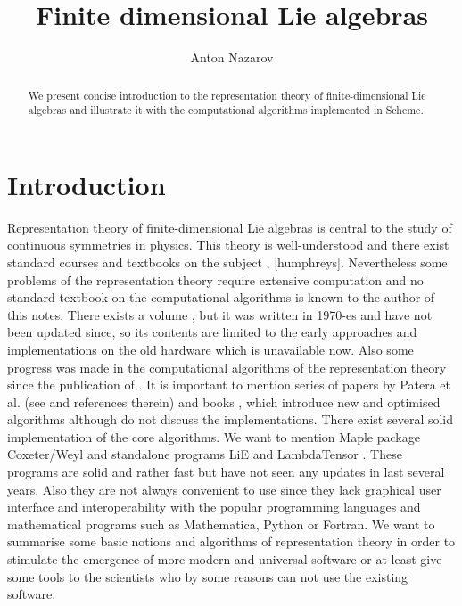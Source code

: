 \documentclass[a4paper,10pt]{article}%
\theoremstyle{definition} \newtheorem{Def}{Definition}
\begin{document}
\nwdocspar
\title{Finite dimensional Lie algebras}
\author{Anton Nazarov}
\maketitle
\begin{abstract}
  We present concise introduction to the representation theory of finite-dimensional Lie algebras and illustrate it with the computational algorithms implemented in Scheme. 
\end{abstract}
\section{Introduction}
\label{sec:introduction}
Representation theory of finite-dimensional Lie algebras is central to the study of continuous symmetries in physics. This theory is well-understood and there exist standard courses and textbooks on the subject \cite{carter2005lie}, [humphreys]. Nevertheless some problems of the representation theory require extensive computation and no standard textbook on the computational algorithms is known to the author of this notes. There exists a volume \cite{belinfante1989survey}, but it was written in 1970-es and have not been updated since, so its contents are limited to the early approaches and implementations on the old hardware which is unavailable now. Also some progress was made in the computational algorithms of the representation theory since the publication of \cite{belinfante1989survey}. It is important to mention series of papers by Patera et al. (see \cite{moody1982fast} and references therein) and books \cite{kass1990ala}, \cite{bremner1985tables} which introduce new and optimised algorithms although do not discuss the implementations.
There exist several solid implementation of the core algorithms. We want to mention Maple package Coxeter/Weyl \cite{stembridge1995mps} and standalone programs LiE \cite{vanleeuwen1994lsp} and LambdaTensor \cite{fischbacher2002ilp}. These programs are solid and rather fast but have not seen any updates in last several years. Also they are not always convenient to use since they lack graphical user interface and interoperability with the popular programming languages and mathematical programs such as Mathematica, Python or Fortran.
We want to summarise some basic notions and algorithms of representation theory in order to stimulate the emergence of more modern and universal software or at least give some tools to the scientists who by some reasons can not use the existing software.
\end{document}
